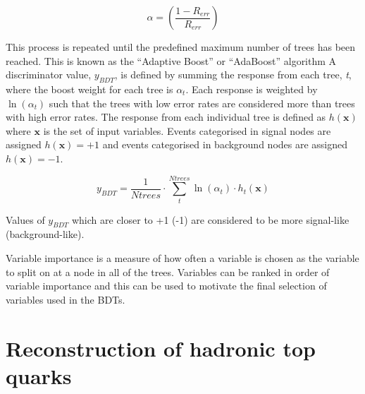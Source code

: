 \begin{equation}
\alpha = \left( \frac{1-R_{err}}{R_{err}}  \right)
\label{eqn:ErrorWeight}
\end{equation}

This process is repeated until the predefined maximum number of trees has been reached. This is known as the ``Adaptive Boost'' or ``AdaBoost'' algorithm
A discriminator value, $y_{BDT}$, is defined by summing the response from each tree, \emph{t}, where the boost weight for each tree is $\alpha_{t}$. Each response is weighted by $\ln \left(\alpha_{t}\right)$ such that the trees with low error rates are considered more than trees with high error rates. The response from each individual tree is defined as $h\left(\textbf{x}\right)$ where $\textbf{x}$ is the set of input variables. Events categorised in signal nodes are assigned $h\left(\textbf{x}\right) = +1 $ and events categorised in background nodes are assigned $h\left(\textbf{x}\right) = -1 $. 

\begin{equation}
y_{BDT} = \frac{1}{Ntrees} \cdot \sum_{t}^{Ntrees} \ln \left(\alpha_{t}\right) \cdot h_{t}\left(\textbf{x}\right)
\end{equation}

Values of $y_{BDT}$ which are closer to +1 (-1) are considered to be more signal-like (background-like).

Variable importance is a measure of how often a variable is chosen as the variable to split on at a node in all of the trees. Variables can be ranked in order of variable importance and this can be used to motivate the final selection of variables used in the BDTs. 

\section{Reconstruction of hadronic top quarks \label{sec:topreco}}

